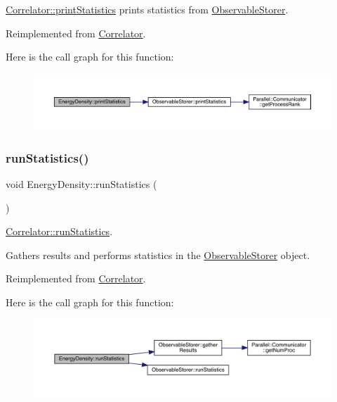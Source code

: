 \mbox{\hyperlink{class_correlator_a2168d677f547769784781d2e2aaa53cf}{Correlator\+::print\+Statistics}} prints statistics from \mbox{\hyperlink{class_observable_storer}{Observable\+Storer}}. 



Reimplemented from \mbox{\hyperlink{class_correlator_a2168d677f547769784781d2e2aaa53cf}{Correlator}}.

Here is the call graph for this function\+:
\nopagebreak
\begin{figure}[H]
\begin{center}
\leavevmode
\includegraphics[width=350pt]{class_energy_density_ad108e32bc670f17f15b4ed433d8bbec7_cgraph}
\end{center}
\end{figure}
\mbox{\label{class_energy_density_a584e164453ce880a45478c9b48ce2c4b}} 
\subsubsection{\texorpdfstring{runStatistics()}{runStatistics()}}
{\footnotesize\ttfamily void Energy\+Density\+::run\+Statistics (\begin{DoxyParamCaption}{ }\end{DoxyParamCaption})\hspace{0.3cm}{\ttfamily [virtual]}}



\mbox{\hyperlink{class_correlator_a35197b1d12b62ef30b79c0138a26456e}{Correlator\+::run\+Statistics}}. 

Gathers results and performs statistics in the \mbox{\hyperlink{class_observable_storer}{Observable\+Storer}} object. 

Reimplemented from \mbox{\hyperlink{class_correlator_a35197b1d12b62ef30b79c0138a26456e}{Correlator}}.

Here is the call graph for this function\+:
\nopagebreak
\begin{figure}[H]
\begin{center}
\leavevmode
\includegraphics[width=350pt]{class_energy_density_a584e164453ce880a45478c9b48ce2c4b_cgraph}
\end{center}
\end{figure}


